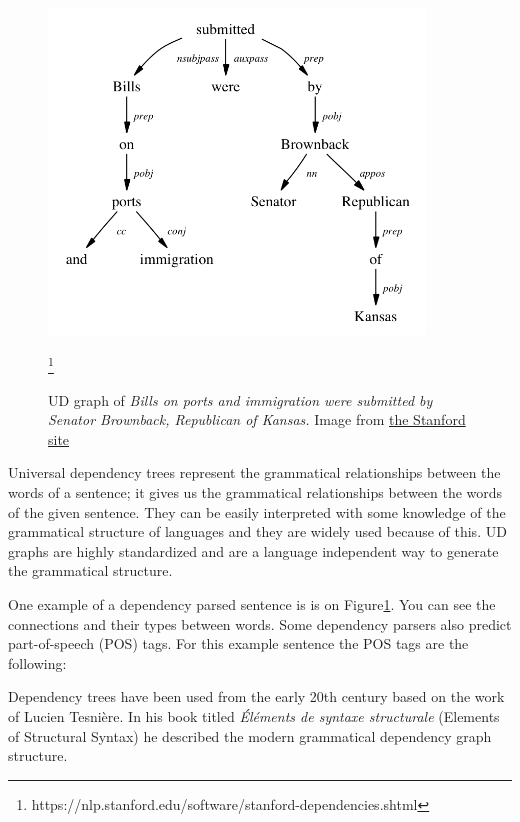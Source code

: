 \begin{figure}[!ht]
	\centering
	\includegraphics[width=100mm, keepaspectratio]{figures/UD.png}
	\caption{UD graph of \textit{Bills on ports and immigration were submitted by Senator Brownback, Republican of Kansas.} Image from \href{https://nlp.stanford.edu/software/stanford-dependencies.shtml}{the Stanford site}}\footnote{https://nlp.stanford.edu/software/stanford-dependencies.shtml}
	\label{fig:UD}
\end{figure}

Universal dependency trees represent the grammatical relationships between the words of a sentence; it gives us the grammatical relationships between the words of the given sentence. They can be easily interpreted with some knowledge of the grammatical structure of languages and they are widely used because of this. UD graphs are highly standardized and are a language independent way to generate the grammatical structure.

One example of a dependency parsed sentence is is on Figure\ref{fig:UD}. You can see the connections and their types between words. Some dependency parsers also predict part-of-speech (POS) tags. For this example sentence the POS tags are the following:

Dependency trees have been used from the early 20th century based on the work of Lucien Tesni\`ere. In his book titled \textit{\'El\'ements de syntaxe structurale} (Elements of Structural Syntax)\cite{UD} he described the modern grammatical dependency graph structure.

